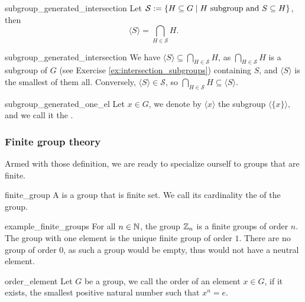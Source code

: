 \begin{cprop}{}{subgroup_generated_intersection}
    Let \( \mathcal S := \{ H \subseteq G \mid H \text{ subgroup and } S \subseteq H\} \), then
    \begin{equation*}
        \langle S \rangle = \bigcap_{H \in \mathcal S} H.
    \end{equation*}
\end{cprop}
\begin{propproof}{subgroup_generated_intersection}
    We have \( \langle S \rangle \subseteq \bigcap_{H \in \mathcal S} H \), as \( \bigcap_{H \in \mathcal S} H \) is a subgroup of \( G \) (see Exercise \ref{ex:intersection_subgroups}) containing \( S \), and \( \langle S \rangle \) is the smallest of them all. Conversely, \( \langle S \rangle \in \mathcal{S} \), so \( \bigcap_{H \in \mathcal S} H \subseteq \langle S \rangle \). 
\end{propproof}

\begin{cdef}{}{subgroup_generated_one_el}
    Let \( x \in G \), we denote by \( \langle x \rangle \) the subgroup \( \langle \{ x \} \rangle \), and we call it the .    
\end{cdef}

\subsubsection{Finite group theory}

Armed with those definition, we are ready to specialize ourself to groups that are finite. 
\begin{cdef}{}{finite_group}
    A  is a group that is finite set. We call its cardinality the  of the group.
\end{cdef}

\begin{cex}{}{example_finite_groups}
    For all \( n \in \mathbb{N} \), the group \( \mathbb{Z}_n \) is a finite groups of order \( n \). The group with one element is the unique finite group of order \( 1 \). There are no group of order \( 0 \), as such a group would be empty, thus would not have a neutral element. 
\end{cex}

\begin{cdef}{}{order_element}
    Let \( G \) be a group, we call the order of an element \( x \in G \), if it exists, the smallest positive natural number such that \( x^n = e \). 
\end{cdef}

